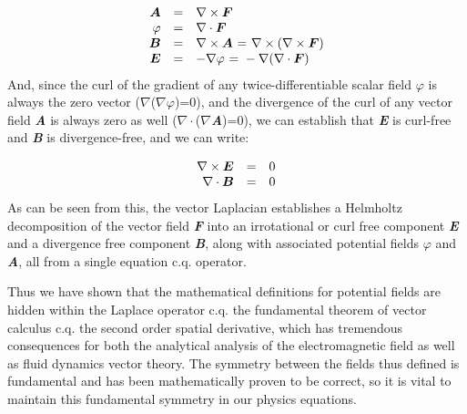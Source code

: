 \documentclass[a4paper]{article}
\newcommand\textstyleNone[1]{#1}
\newcounter{Text}
\newcommand\boldsubformula[1]{\text{\mathversion{bold}$#1$}}
\begin{document}
\begin{equation}\label{seq:refText5}
\begin{matrix}\hfill \boldsubformula A&=&\nabla \times \boldsubformula F\hfill\null \\\hfill \varphi &=&\nabla \cdot
\boldsubformula F\hfill\null \\\hfill \boldsubformula B&=&\nabla \times \boldsubformula A\text{ = }\nabla \times
(\nabla \times \boldsubformula F)\hfill\null \\\hfill \boldsubformula E&=&-\nabla \varphi \text{ = }-\nabla (\nabla
\cdot \boldsubformula F)\hfill\null \end{matrix}
\end{equation}
{
\textstyleNone{{And, since the curl of the gradient of any
twice-differentiable scalar field }{$\varphi $
}{is always the zero vector
}{(}{${\nabla}$}{{\texttimes}(}{${\nabla}$}{$\varphi
$}{)=}{0)}{,
and the divergence of the curl of any vector field
}\textbf{\textit{{A
}}}{is always zero as well
(}{${\nabla}{\cdot}$}{(}{${\nabla}$}{{\texttimes}}\textbf{\textit{{A}}}{)=0),
we can establish that }\textbf{\textit{{E
}}}{is
}{curl-free
}{and
}\textbf{\textit{{B
}}}{is
}{divergence-free}{,
and we can write}: }}

\begin{equation}
\begin{matrix}\hfill \nabla \times \boldsubformula E&=&0\hfill\null \\\hfill \nabla \cdot \boldsubformula
B&=&0\hfill\null \end{matrix}
\end{equation}
{
\textstyleNone{As can be seen from this, the vector Laplacian establishes a Helmholtz decomposition of the vector field
\textbf{\textit{F}} into an {irrotational or }curl free component
\textbf{\textit{E}} and a divergence free component \textbf{\textit{B}}, along with associated potential fields
{$\varphi $} and \textbf{\textit{A}}, all from a single equation
c.q. operator. }}

{
\textstyleNone{Thus we have shown that the mathematical definitions for potential fields are hidden within the Laplace
operator c.q. the fundamental theorem of vector calculus c.q. the second order spatial derivative, which has tremendous
consequences for both the analytical analysis of the electromagnetic field as well as fluid dynamics vector theory. The
symmetry between the fields thus defined is fundamental and has been mathematically proven to be correct, so it is
vital to maintain this fundamental symmetry in our physics equations. }}
\end{document}
